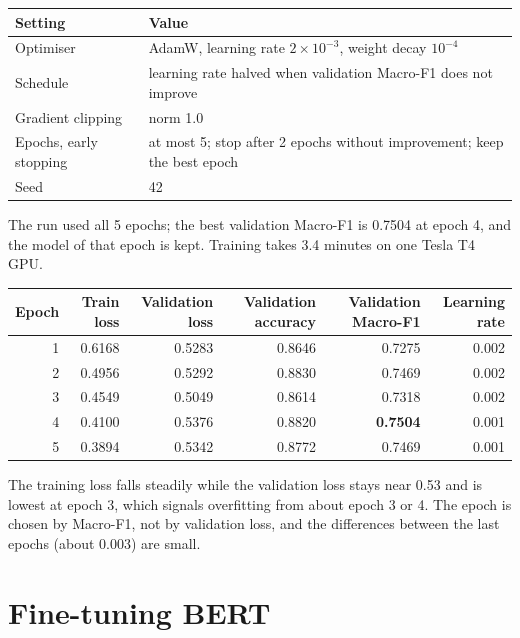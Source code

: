 \begin{center}
\begin{tabular}{@{}p{5cm}p{9cm}@{}}
    \toprule
    Setting & Value \\
    \midrule
    Optimiser & AdamW, learning rate $2\times10^{-3}$, weight decay $10^{-4}$ \\
    Schedule & learning rate halved when validation Macro-F1 does not improve \\
    Gradient clipping & norm 1.0 \\
    Epochs, early stopping & at most 5; stop after 2 epochs without improvement; keep the best epoch \\
    Seed & 42 \\
    \bottomrule
\end{tabular}
\end{center}

The run used all 5 epochs; the best validation Macro-F1 is 0.7504 at epoch 4, and the model of that epoch is kept. Training takes 3.4 minutes on one Tesla T4 GPU.

\begin{center}
\small
\begin{tabular}{@{}rrrrrr@{}}
    \toprule
    Epoch & Train loss & Validation loss & Validation accuracy & Validation Macro-F1 & Learning rate \\
    \midrule
    1 & 0.6168 & 0.5283 & 0.8646 & 0.7275 & 0.002 \\
    2 & 0.4956 & 0.5292 & 0.8830 & 0.7469 & 0.002 \\
    3 & 0.4549 & 0.5049 & 0.8614 & 0.7318 & 0.002 \\
    4 & 0.4100 & 0.5376 & 0.8820 & \textbf{0.7504} & 0.001 \\
    5 & 0.3894 & 0.5342 & 0.8772 & 0.7469 & 0.001 \\
    \bottomrule
\end{tabular}
\end{center}

The training loss falls steadily while the validation loss stays near 0.53 and is lowest at epoch 3, which signals overfitting from about epoch 3 or 4. The epoch is chosen by Macro-F1, not by validation loss, and the differences between the last epochs (about 0.003) are small.

\section{Fine-tuning BERT}
\label{sec:6-5}


